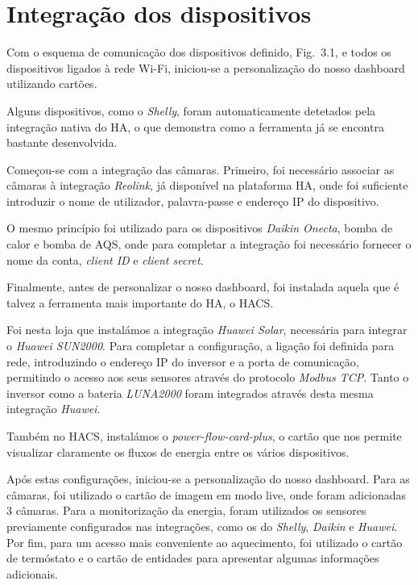 \section{Integração dos dispositivos}

Com o esquema de comunicação dos dispositivos definido, Fig.~3.1, e todos os dispositivos ligados à rede Wi-Fi, iniciou-se a personalização do nosso dashboard utilizando cartões.\

Alguns dispositivos, como o \textit{Shelly}, foram automaticamente detetados pela integração nativa do \gls{HA}, o que demonstra como a ferramenta já se encontra bastante desenvolvida.

Começou-se com a integração das câmaras. Primeiro, foi necessário associar as câmaras à integração \textit{Reolink}, já disponível na plataforma \gls{HA}, onde foi suficiente introduzir o nome de utilizador, palavra-passe e endereço IP do dispositivo.

O mesmo princípio foi utilizado para os dispositivos \textit{Daikin Onecta}, bomba de calor e bomba de AQS, onde para completar a integração foi necessário fornecer o nome da conta, \textit{client ID} e \textit{client secret}.

Finalmente, antes de personalizar o nosso dashboard, foi instalada aquela que é talvez a ferramenta mais importante do \gls{HA}, o \gls{HACS}.

Foi nesta loja que instalámos a integração \textit{Huawei Solar}, necessária para integrar o \textit{Huawei SUN2000}. Para completar a configuração, a ligação foi definida para rede, introduzindo o endereço IP do inversor e a porta de comunicação, permitindo o acesso aos seus sensores através do protocolo \textit{Modbus TCP}. Tanto o inversor como a bateria \textit{LUNA2000} foram integrados através desta mesma integração \textit{Huawei}.

Também no \gls{HACS}, instalámos o \textit{power-flow-card-plus}, o cartão que nos permite visualizar claramente os fluxos de energia entre os vários dispositivos.

Após estas configurações, iniciou-se a personalização do nosso dashboard. Para as câmaras, foi utilizado o cartão de imagem em modo live, onde foram adicionadas 3 câmaras. Para a monitorização da energia, foram utilizados os sensores previamente configurados nas integrações, como os do \textit{Shelly}, \textit{Daikin} e \textit{Huawei}. Por fim, para um acesso mais conveniente ao aquecimento, foi utilizado o cartão de termóstato e o cartão de entidades para apresentar algumas informações adicionais.

